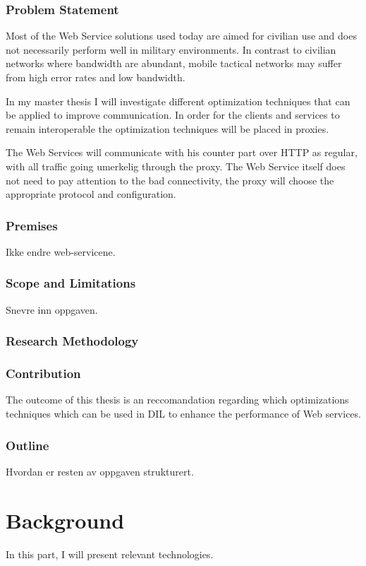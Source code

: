 \documentclass[USenglish]{article}
\begin{document}
\section{Problem Statement}
Most of the Web Service solutions used today are aimed for civilian use and does
not necessarily perform well in military environments. In contrast to civilian
networks where bandwidth are abundant, mobile tactical networks may suffer
from high error rates and low bandwidth.

In my master thesis I will investigate different optimization techniques that
can be applied to improve communication. In order for the clients and services
 to remain interoperable the optimization techniques will be placed in proxies.

The Web Services will communicate with his counter part over HTTP as regular,
with all traffic going umerkelig through the proxy. The Web Service itself does
not need to pay attention to the bad connectivity, the proxy will choose the
appropriate protocol and configuration.

\section{Premises}
Ikke endre web-servicene.

\section{Scope and Limitations}
Snevre inn oppgaven.

\section{Research Methodology}

\section{Contribution}
The outcome of this thesis is an reccomandation regarding which optimizations techniques which can be used in DIL to enhance the performance of Web services.

\section{Outline}
Hvordan er resten av oppgaven strukturert.


\part{Background}
In this part, I will present relevant technologies.
\end{document}
